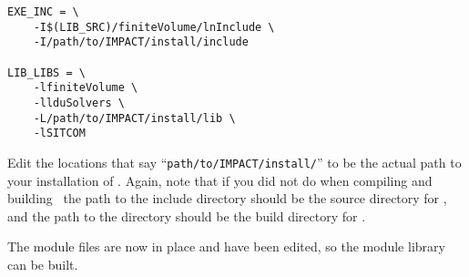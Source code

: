 \begin{mdframed}[]
\begin{verbatim}
EXE_INC = \
    -I$(LIB_SRC)/finiteVolume/lnInclude \
    -I/path/to/IMPACT/install/include

LIB_LIBS = \
    -lfiniteVolume \
    -llduSolvers \
    -L/path/to/IMPACT/install/lib \
    -lSITCOM
\end{verbatim}
\end{mdframed}

Edit the locations that say ``\texttt{path/to/IMPACT/install/}'' to be the actual path to your installation of . Again, note that if you did not do  when compiling and building \impact\, the path to the include directory should be the source directory for \impact, and the path to the  directory should be the build directory for \impact.

The module files are now in place and have been edited, so the module library can be built.

